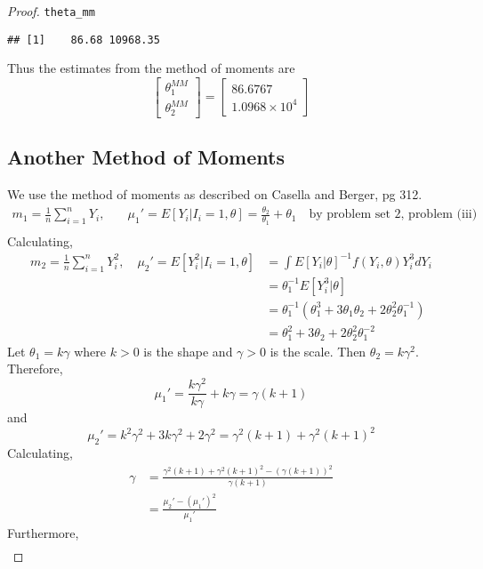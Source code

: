 \documentclass[letterpaper, 12pt]{article}\usepackage[]{graphicx}\usepackage[]{color}
\makeatletter
\newcommand{\hlstd}[1]{\textcolor[rgb]{0.345,0.345,0.345}{#1}}%
\newenvironment{kframe}{%
 \def\at@end@of@kframe{}%
 \ifinner\ifhmode%
  \def\at@end@of@kframe{\end{minipage}}%
  \begin{minipage}{\columnwidth}%
 \fi\fi%
 \def\FrameCommand##1{\hskip\@totalleftmargin \hskip-\fboxsep
 \colorbox{shadecolor}{##1}\hskip-\fboxsep
     \hskip-\linewidth \hskip-\@totalleftmargin \hskip\columnwidth}%
 \MakeFramed {\advance\hsize-\width
   \@totalleftmargin\z@ \linewidth\hsize
   \@setminipage}}%
 {\par\unskip\endMakeFramed%
 \at@end@of@kframe}
\newenvironment{knitrout}{}{} %
\makeatother
\begin{document}
\begin{proof}
\begin{knitrout}
\begin{kframe}
\begin{alltt}
\hlstd{theta_mm}
\end{alltt}
\begin{verbatim}
## [1]    86.68 10968.35
\end{verbatim}
\end{kframe}
\end{knitrout}

Thus the estimates from the method of moments are
\[
\begin{bmatrix}
\theta_1^{MM}
\\
\theta_2^{MM}
\end{bmatrix}
=
\begin{bmatrix}
86.6767
\\
\ensuremath{1.0968\times 10^{4}}
\end{bmatrix}
\]
\subsection*{Another Method of Moments}
We use the method of moments as described on Casella and Berger, pg 312. 
\begin{align*}
m_1 = \frac{1}{n} \sum_{i=1}^n Y_i, &\quad \mu_1' = E[Y_i|I_i=1, \theta] = \frac{\theta_2}{\theta_1} + \theta_1
\quad \text{by problem set 2, problem (iii)} \\
\end{align*}
Calculating,
\begin{align*}
m_2 = \frac{1}{n} \sum_{i=1}^n Y_i^2, \quad 
\mu_2' =
E[Y_i^2 | I_i=1, \theta] 
&= 
\int E[Y_i | \theta]^{-1}f(Y_i, \theta)Y_i^3 dY_i
\\
&=
\theta_1^{-1}E[Y_i^3 | \theta]
\\
&=
\theta_1^{-1}
\left(
\theta_1^3 + 3\theta_1\theta_2 + 2 \theta_2^2\theta_1^{-1}
\right)
\\
&=
\theta_1^2 +3\theta_2 +2\theta^2_2\theta_1^{-2}
\end{align*}
Let $\theta_1 = k\gamma$ where $k > 0$ is the shape and $\gamma >0$ is the scale. Then $\theta_2 = k\gamma^2$.
Therefore,
\[
\mu_1' = \frac{k\gamma^2}{k\gamma} + k\gamma = \gamma(k+1)
\]
and
\[
\mu_2' = k^2\gamma^2 +3k\gamma^2 + 2\gamma^2 = \gamma^2(k+1)+\gamma^2(k+1)^2
\]
Calculating,
\begin{align*}
\gamma
&=
\frac{
\gamma^2 (k+1) + \gamma^2(k+1)^2 - (\gamma(k+1))^2
}
{
\gamma(k+1)
}
\\
&=
\frac{
\mu_2' - (\mu_1')^2
}{\mu_1'}
\end{align*}
Furthermore,
\begin{align*}

\end{align*}
\end{proof}
\end{document}
